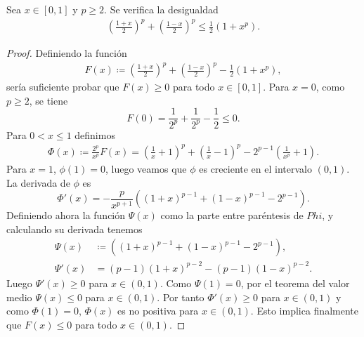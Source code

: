 \begin{lemma} \label{lema:clarkson-1}
    Sea $ x \in [0, 1] $ y $ p \geq 2 $. Se verifica la desigualdad
    \begin{align}
        \left( \frac{1+x}{2} \right)^p + \left( \frac{1-x}{2} \right)^p \leq \frac{1}{2} (1 + x^p).
    \end{align}
\end{lemma}
\begin{proof}
    Definiendo la función
    \begin{align}
        F(x) \coloneq \left( \frac{1+x}{2} \right)^p + \left( \frac{1-x}{2} \right)^p - \frac{1}{2} (1 + x^p),
    \end{align}
    sería suficiente probar que $ F(x) \geq 0 $ para todo $ x \in [0, 1] $. Para $ x = 0 $, como $ p \geq 2 $, se tiene 
    \begin{equation}
        F(0) = \frac{1}{2^p} + \frac{1}{2^p} - \frac{1}{2} \leq 0.
    \end{equation}
    Para $ 0 < x \leq 1 $ definimos
    \begin{align}
        \Phi(x) \coloneq \frac{2^p}{x^p} F(x) = \left( \frac{1}{x} + 1 \right)^p + \left( \frac{1}{x} - 1 \right)^p - 2^{p-1} \left( \frac{1}{x^p} + 1 \right).
    \end{align}
    Para $ x = 1 $, $ \phi(1) = 0 $, luego veamos que $ \phi $ es creciente en el intervalo $ (0, 1) $. La derivada de $ \phi $ es
    \begin{equation}
        \Phi'(x) = -\frac{p}{x^{p+1}} \left( (1+x)^{p-1} + (1-x)^{p-1} - 2^{p-1} \right).
    \end{equation}
    Definiendo ahora la función $ \Psi(x) $ como la parte entre paréntesis de $ Phi$, y calculando su derivada tenemos
    \begin{equation}
    \begin{split}
        \Psi(x) &\coloneq \left( (1+x)^{p-1} + (1-x)^{p-1} - 2^{p-1} \right), \\
        \Psi'(x) &= (p-1)(1+x)^{p-2} - (p-1)(1-x)^{p-2}.
    \end{split}
    \end{equation}
    Luego $ \Psi'(x) \geq 0 $ para $ x \in (0, 1) $. Como $ \Psi(1) = 0 $, por el teorema del valor medio $ \Psi(x) \leq 0 $ para $ x \in (0, 1) $. Por tanto $ \Phi'(x) \geq 0 $ para $ x \in (0, 1) $ y como $ \Phi(1) = 0 $, $ \Phi(x) $ es no positiva para $ x \in (0, 1) $. Esto implica finalmente que $ F(x) \leq 0 $ para todo $ x \in (0, 1) $.
\end{proof}

